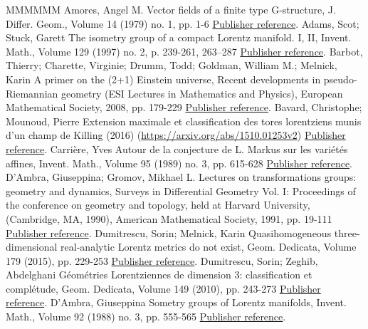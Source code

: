 \documentclass[11pt]{article}
\theoremstyle{definition}
\numberwithin{equation}{section}
\numberwithin{figure}{section}
\numberwithin{table}{section}
\begin{document}
\begin{thebibliography}{MMMMMM}
 Amores, Angel M. Vector fields of a finite type G-structure, J. Differ. Geom., Volume 14 (1979) no. 1, pp. 1-6 \href{https://ahl.centre-mersenne.org/item/AHL_2020__3__407_0/#amores}{Publisher reference}.
 Adams, Scot; Stuck, Garett The isometry group of a compact Lorentz manifold. I, II, Invent. Math., Volume 129 (1997) no. 2, p. 239-261, 263–287 \href{https://ahl.centre-mersenne.org/item/AHL_2020__3__407_0/#adams.stuck}{Publisher reference}.
 Barbot, Thierry; Charette, Virginie; Drumm, Todd; Goldman, William M.; Melnick, Karin A primer on the (2+1) Einstein universe, Recent developments in pseudo-Riemannian geometry (ESI Lectures in Mathematics and Physics), European Mathematical Society, 2008, pp. 179-229 \href{https://ahl.centre-mersenne.org/item/AHL_2020__3__407_0/#primer}{Publisher reference}.
 Bavard, Christophe; Mounoud, Pierre Extension maximale et classification des tores lorentziens munis d’un champ de Killing (2016) (\url{https://arxiv.org/abs/1510.01253v2}) \href{https://ahl.centre-mersenne.org/item/AHL_2020__3__407_0/#mounoud}{Publisher reference}.
 Carrière, Yves Autour de la conjecture de L. Markus sur les variétés affines, Invent. Math., Volume 95 (1989) no. 3, pp. 615-628 \href{https://ahl.centre-mersenne.org/item/AHL_2020__3__407_0/#carriere}{Publisher reference}.
 D’Ambra, Giuseppina; Gromov, Mikhael L. Lectures on transformations groups: geometry and dynamics, Surveys in Differential Geometry Vol. I: Proceedings of the conference on geometry and topology, held at Harvard University, (Cambridge, MA, 1990), American Mathematical Society, 1991, pp. 19-111 \href{https://ahl.centre-mersenne.org/item/AHL_2020__3__407_0/#dambragro}{Publisher reference}.
 Dumitrescu, Sorin; Melnick, Karin Quasihomogeneous three-dimensional real-analytic Lorentz metrics do not exist, Geom. Dedicata, Volume 179 (2015), pp. 229-253 \href{https://ahl.centre-mersenne.org/item/AHL_2020__3__407_0/#sorin.karin}{Publisher reference}.
 Dumitrescu, Sorin; Zeghib, Abdelghani Géométries Lorentziennes de dimension 3: classification et complétude, Geom. Dedicata, Volume 149 (2010), pp. 243-273 \href{https://ahl.centre-mersenne.org/item/AHL_2020__3__407_0/#sorin.ghani}{Publisher reference}.
 D’Ambra, Giuseppina Sometry groups of Lorentz manifolds, Invent. Math., Volume 92 (1988) no. 3, pp. 555-565 \href{https://ahl.centre-mersenne.org/item/AHL_2020__3__407_0/#dambra}{Publisher reference}.

\end{thebibliography}
\end{document}
